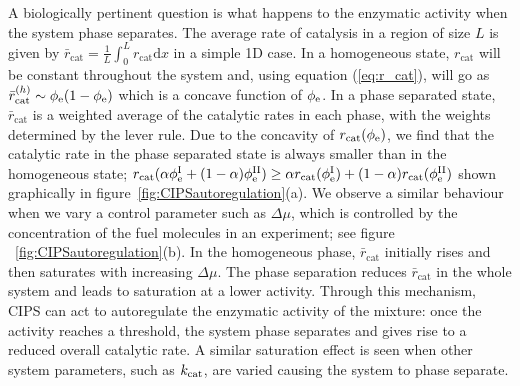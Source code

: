 A biologically pertinent question is what happens to the enzymatic activity when the system phase separates. The average rate of catalysis in a region of size $L$ is given by $\bar{r}_\mathrm{cat} = \frac{1}{L}\int_0^L r_\mathrm{cat} \mathrm{d}x$ in a simple 1D case. In a homogeneous state, $r_\mathrm{cat}$ will be constant throughout the system and, using equation (\ref{eq:r_cat}), will go as $\bar{r}_\mathrm{cat}^{\mathrm(h)}\sim\phi_{\mathrm{e}}(1-\phi_{\mathrm{e}})$ which is a concave function of $\phi_{\mathrm{e}}$. In a phase separated state, $\bar{r}_\mathrm{cat}$ is a weighted average of the catalytic rates in each phase, with the weights determined by the lever rule. Due to the concavity of $r_{\mathrm{cat}}(\phi_{\mathrm{e}})$, we find that the catalytic rate in the phase separated state is always smaller than in the homogeneous state; $r_{\mathrm{cat}}(\alpha\phi_{\mathrm{e}}^{\mathrm{I}}+(1-\alpha)\phi_{\mathrm{e}}^{\mathrm{II}}) \geq \alpha r_{\mathrm{cat}}(\phi_{\mathrm{e}}^{\mathrm{I}})+(1-\alpha)r_{\mathrm{cat}}(\phi_{\mathrm{e}}^{\mathrm{II}})$ shown graphically in figure~\ref{fig:CIPSautoregulation}(a). We observe a similar behaviour when we vary a control parameter such as $\Delta\mu$, which is controlled by the concentration of the fuel molecules in an experiment; see figure ~\ref{fig:CIPSautoregulation}(b). In the homogeneous phase, $\bar{r}_\mathrm{cat}$ initially rises and then saturates with increasing $\Delta\mu$. The phase separation reduces $\bar{r}_\mathrm{cat}$ in the whole system and leads to saturation at a lower activity. Through this mechanism, CIPS can act to autoregulate the enzymatic activity of the mixture: once the activity reaches a threshold, the system phase separates and gives rise to a reduced overall catalytic rate. A similar saturation effect is seen when other system parameters, such as $k_{\mathrm{cat}}$, are varied causing the system to phase separate.

